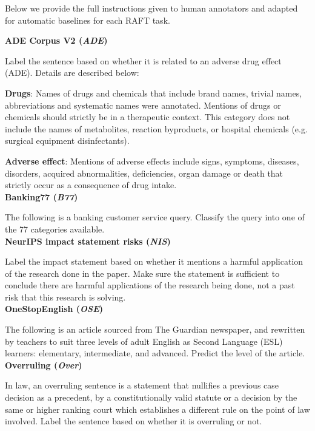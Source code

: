 \documentclass{article}
\newcommand{\name}{\textsc{RAFT}}
\begin{document}
Below we provide the full instructions given to human annotators and adapted for automatic baselines for each \name{} task.

\textbf{ADE Corpus V2 (\textit{ADE})}

Label the sentence based on whether it is related to an adverse drug effect (ADE). Details are described below: 

\textbf{Drugs}: Names of drugs and chemicals that include brand names, trivial names, abbreviations and systematic names were annotated. Mentions of drugs or chemicals should strictly be in a therapeutic context. This category does not include the names of metabolites, reaction byproducts, or hospital chemicals (e.g. surgical equipment disinfectants). 

\textbf{Adverse effect}: Mentions of adverse effects include signs, symptoms, diseases, disorders, acquired abnormalities, deficiencies, organ damage or death that strictly occur as a consequence of drug intake. \\

\textbf{Banking77 (\textit{B77})}

The following is a banking customer service query. Classify the query into one of the 77 categories available. \\    

\textbf{NeurIPS impact statement risks (\textit{NIS})}

Label the impact statement based on whether it mentions a harmful application of the research done in the paper. Make sure the statement is sufficient to conclude there are harmful applications of the research being done, not a past risk that this research is solving. \\

\textbf{OneStopEnglish (\textit{OSE})}

The following is an article sourced from The Guardian newspaper, and rewritten by teachers to suit three levels of adult English as Second Language (ESL) learners: elementary, intermediate, and advanced. Predict the level of the article. \\

\textbf{Overruling (\textit{Over})}

In law, an overruling sentence is a statement that nullifies a previous case decision as a precedent, by a constitutionally valid statute or a decision by the same or higher ranking court which establishes a different rule on the point of law involved. Label the sentence based on whether it is overruling or not. \\
\end{document}
